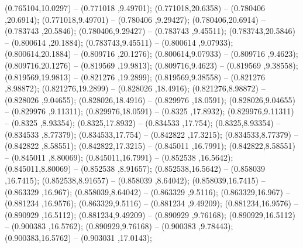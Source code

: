  (0.765104,10.0297) -- (0.771018 ,9.49701);
 (0.771018,20.6358) -- (0.780406 ,20.6914);
 (0.771018,9.49701) -- (0.780406 ,9.29427);
 (0.780406,20.6914) -- (0.783743 ,20.5846);
 (0.780406,9.29427) -- (0.783743 ,9.45511);
 (0.783743,20.5846) -- (0.800614 ,20.1884);
 (0.783743,9.45511) -- (0.800614 ,9.07933);
 (0.800614,20.1884) -- (0.809716 ,20.1276);
 (0.800614,9.07933) -- (0.809716 ,9.4623);
 (0.809716,20.1276) -- (0.819569 ,19.9813);
 (0.809716,9.4623) -- (0.819569 ,9.38558);
 (0.819569,19.9813) -- (0.821276 ,19.2899);
 (0.819569,9.38558) -- (0.821276 ,8.98872);
 (0.821276,19.2899) -- (0.828026 ,18.4916);
 (0.821276,8.98872) -- (0.828026 ,9.04655);
 (0.828026,18.4916) -- (0.829976 ,18.0591);
 (0.828026,9.04655) -- (0.829976 ,9.11311);
 (0.829976,18.0591) -- (0.8325 ,17.8932);
 (0.829976,9.11311) -- (0.8325 ,8.93354);
 (0.8325,17.8932) -- (0.834533 ,17.754);
 (0.8325,8.93354) -- (0.834533 ,8.77379);
 (0.834533,17.754) -- (0.842822 ,17.3215);
 (0.834533,8.77379) -- (0.842822 ,8.58551);
 (0.842822,17.3215) -- (0.845011 ,16.7991);
 (0.842822,8.58551) -- (0.845011 ,8.80069);
 (0.845011,16.7991) -- (0.852538 ,16.5642);
 (0.845011,8.80069) -- (0.852538 ,8.91657);
 (0.852538,16.5642) -- (0.858039 ,16.7415);
 (0.852538,8.91657) -- (0.858039 ,8.64042);
 (0.858039,16.7415) -- (0.863329 ,16.967);
 (0.858039,8.64042) -- (0.863329 ,9.5116);
 (0.863329,16.967) -- (0.881234 ,16.9576);
 (0.863329,9.5116) -- (0.881234 ,9.49209);
 (0.881234,16.9576) -- (0.890929 ,16.5112);
 (0.881234,9.49209) -- (0.890929 ,9.76168);
 (0.890929,16.5112) -- (0.900383 ,16.5762);
 (0.890929,9.76168) -- (0.900383 ,9.78443);
 (0.900383,16.5762) -- (0.903031 ,17.0143);
